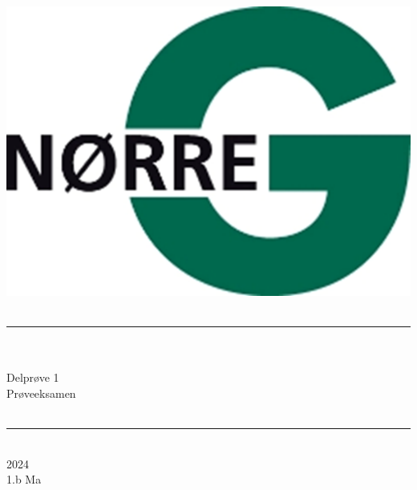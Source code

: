 \documentclass[12pt,x11names,a4paper]{article}
\begin{document}
%

\begin{titlepage}

\begin{minipage}{0.27\textwidth}

\end{minipage}
\begin{minipage}{0.73\textwidth}
\begin{center}
\phantom{h} \vspace{1cm}\\
\hspace{4cm}
\includegraphics[scale = 1]{Billeder/Norreg.png} \\
\phantom{h} \vspace{5cm}\\
\rule{0.7\textwidth}{0.3mm}\\
\phantom{h}\\
{\fontsize{50}{60}\selectfont Delprøve 1 \\ Prøveeksamen}\\
\phantom{h}\\
\rule{0.7\textwidth}{0.3mm}\\
\Large 2024\\
\Large 1.b Ma

\end{center}
\end{minipage}
\end{titlepage}
\end{document}
